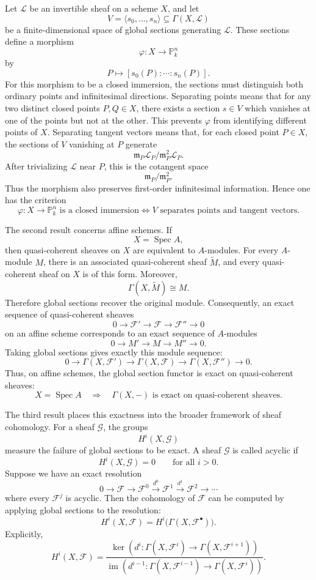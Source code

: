 \documentclass[12pt,a4paper]{article}
\theoremstyle{notespace}
\begin{document}
Let \(\mathcal L\) be an invertible sheaf on a scheme \(X\), and let
\[
V=\langle s_0,\dots,s_n\rangle\subseteq \Gamma(X,\mathcal L)
\]
be a finite-dimensional space of global sections generating \(\mathcal L\). These sections define a morphism
\[
\varphi:X\to \mathbb P^n_k
\]
by
\[
P\mapsto [s_0(P):\cdots:s_n(P)].
\]
For this morphism to be a closed immersion, the sections must distinguish both ordinary points and infinitesimal directions. Separating points means that for any two distinct closed points \(P,Q\in X\), there exists a section \(s\in V\) which vanishes at one of the points but not at the other. This prevents \(\varphi\) from identifying different points of \(X\). Separating tangent vectors means that, for each closed point \(P\in X\), the sections of \(V\) vanishing at \(P\) generate
\[
\mathfrak m_P\mathcal L_P/\mathfrak m_P^2\mathcal L_P.
\]
After trivializing \(\mathcal L\) near \(P\), this is the cotangent space
\[
\mathfrak m_P/\mathfrak m_P^2.
\]
Thus the morphism also preserves first-order infinitesimal information. Hence one has the criterion
\[
\boxed{
	\varphi:X\to \mathbb P^n_k
	\text{ is a closed immersion}
	\iff
	V\text{ separates points and tangent vectors.}
}
\]

The second result concerns affine schemes. If
\[
X=\operatorname{Spec}A,
\]
then quasi-coherent sheaves on \(X\) are equivalent to \(A\)-modules. For every \(A\)-module \(M\), there is an associated quasi-coherent sheaf \(\widetilde M\), and every quasi-coherent sheaf on \(X\) is of this form. Moreover,
\[
\Gamma(X,\widetilde M)\cong M.
\]
Therefore global sections recover the original module. Consequently, an exact sequence of quasi-coherent sheaves
\[
0\to \mathcal F'\to \mathcal F\to \mathcal F''\to 0
\]
on an affine scheme corresponds to an exact sequence of \(A\)-modules
\[
0\to M'\to M\to M''\to 0.
\]
Taking global sections gives exactly this module sequence:
\[
0\to \Gamma(X,\mathcal F')
\to \Gamma(X,\mathcal F)
\to \Gamma(X,\mathcal F'')
\to 0.
\]
Thus, on affine schemes, the global section functor is exact on quasi-coherent sheaves:
\[
\boxed{
	X=\operatorname{Spec}A
	\quad\Longrightarrow\quad
	\Gamma(X,-)
	\text{ is exact on quasi-coherent sheaves.}
}
\]

The third result places this exactness into the broader framework of sheaf cohomology. For a sheaf \(\mathcal G\), the groups
\[
H^i(X,\mathcal G)
\]
measure the failure of global sections to be exact. A sheaf \(\mathcal G\) is called acyclic if
\[
H^i(X,\mathcal G)=0
\qquad\text{for all }i>0.
\]
Suppose we have an exact resolution
\[
0\to \mathcal F
\to \mathcal F^0
\xrightarrow{d^0}
\mathcal F^1
\xrightarrow{d^1}
\mathcal F^2
\to \cdots
\]
where every \(\mathcal F^j\) is acyclic. Then the cohomology of \(\mathcal F\) can be computed by applying global sections to the resolution:
\[
H^i(X,\mathcal F)
=
H^i\bigl(\Gamma(X,\mathcal F^\bullet)\bigr).
\]
Explicitly,
\[
\boxed{
	H^i(X,\mathcal F)
	=
	\frac{
		\ker\left(
		d^i:\Gamma(X,\mathcal F^i)\to \Gamma(X,\mathcal F^{i+1})
		\right)
	}{
		\operatorname{im}\left(
		d^{i-1}:\Gamma(X,\mathcal F^{i-1})\to \Gamma(X,\mathcal F^i)
		\right)
	}.
}
\]
\end{document}
